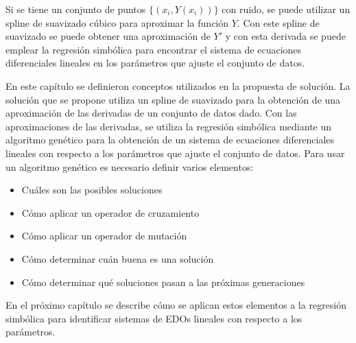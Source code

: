 Si se tiene un conjunto de puntos $\{(x_i, Y(x_i))\}$ con ruido, se puede utilizar un spline de suavizado cúbico para aproximar la función $Y$. Con este spline de suavizado se puede obtener una aproximación de $Y'$ y con esta derivada se puede emplear la regresión simbólica para encontrar el sistema de ecuaciones diferenciales lineales en los parámetros que ajuste el conjunto de datos.

En este capítulo se definieron conceptos utilizados en la propuesta de solución. La solución que se propone utiliza un spline de suavizado para la obtención de una aproximación de las derivadas de un conjunto de datos dado. Con las aproximaciones de las derivadas, se utiliza la regresión simbólica mediante un algoritmo genético para la obtención de un sistema de ecuaciones diferenciales lineales con respecto a los parámetros que ajuste el conjunto de datos. Para usar un algoritmo genético es necesario definir varios elementos:

\begin{itemize}
    \item Cuáles son las posibles soluciones
    \item Cómo aplicar un operador de cruzamiento
    \item Cómo aplicar un operador de mutación
    \item Cómo determinar cuán buena es una solución
    \item Cómo determinar qué soluciones pasan a las próximas generaciones
\end{itemize}

En el próximo capítulo se describe cómo se aplican estos elementos a la regresión simbólica para identificar sistemas de EDOs lineales con respecto a los parámetros.
